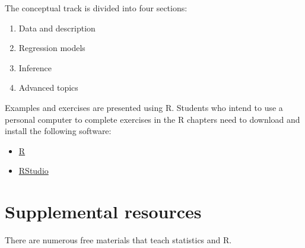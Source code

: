 \documentclass[
]{book}
\providecommand{\tightlist}{%
  \setlength{\itemsep}{0pt}\setlength{\parskip}{0pt}}
\begin{document}
The conceptual track is divided into four sections:

\begin{enumerate}
\def\labelenumi{\arabic{enumi}.}
\tightlist
\item
  Data and description
\item
  Regression models
\item
  Inference
\item
  Advanced topics
\end{enumerate}

Examples and exercises are presented using R. Students who intend to use a personal computer to complete exercises in the R chapters need to download and install the following software:

\begin{itemize}
\tightlist
\item
  \href{https://cloud.r-project.org}{R}
\item
  \href{https://rstudio.com/products/rstudio/download/}{RStudio}
\end{itemize}

\hypertarget{supplemental-resources}{%
\section*{Supplemental resources}\label{supplemental-resources}}

There are numerous free materials that teach statistics and R.
\end{document}
